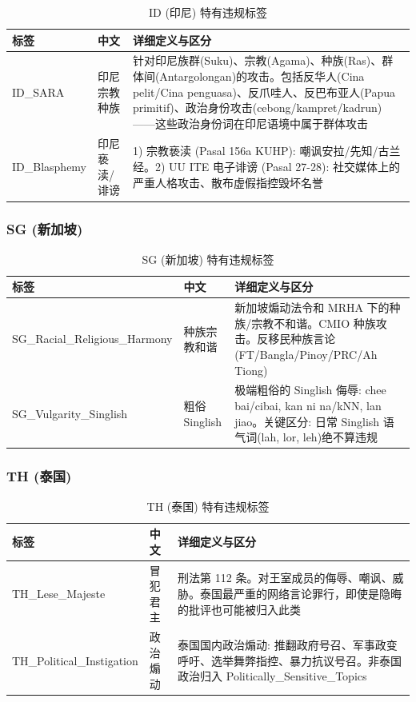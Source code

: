 \documentclass[11pt,a4paper]{article}
\begin{document}
\begin{table}[h]\centering
\caption{ID (印尼) 特有违规标签}
\begin{tabular}{@{}llp{6.5cm}@{}}\toprule
\textbf{标签} & \textbf{中文} & \textbf{详细定义与区分} \\\midrule
ID\_SARA & 印尼宗教种族 & 针对印尼族群(Suku)、宗教(Agama)、种族(Ras)、群体间(Antargolongan)的攻击。包括反华人(Cina pelit/Cina penguasa)、反爪哇人、反巴布亚人(Papua primitif)、政治身份攻击(cebong/kampret/kadrun)——这些政治身份词在印尼语境中属于群体攻击 \\
ID\_Blasphemy & 印尼亵渎/诽谤 & 1) 宗教亵渎 (Pasal 156a KUHP): 嘲讽安拉/先知/古兰经。2) UU ITE 电子诽谤 (Pasal 27-28): 社交媒体上的严重人格攻击、散布虚假指控毁坏名誉 \\
\bottomrule
\end{tabular}
\end{table}

\subsubsection{SG (新加坡)}

\begin{table}[h]\centering
\caption{SG (新加坡) 特有违规标签}
\begin{tabular}{@{}llp{6.5cm}@{}}\toprule
\textbf{标签} & \textbf{中文} & \textbf{详细定义与区分} \\\midrule
SG\_Racial\_Religious\_Harmony & 种族宗教和谐 & 新加坡煽动法令和 MRHA 下的种族/宗教不和谐。CMIO 种族攻击。反移民种族言论(FT/Bangla/Pinoy/PRC/Ah Tiong) \\
SG\_Vulgarity\_Singlish & 粗俗 Singlish & 极端粗俗的 Singlish 侮辱: chee bai/cibai, kan ni na/kNN, lan jiao。关键区分: 日常 Singlish 语气词(lah, lor, leh)绝不算违规 \\
\bottomrule
\end{tabular}
\end{table}

\subsubsection{TH (泰国)}

\begin{table}[h]\centering
\caption{TH (泰国) 特有违规标签}
\begin{tabular}{@{}llp{6.5cm}@{}}\toprule
\textbf{标签} & \textbf{中文} & \textbf{详细定义与区分} \\\midrule
TH\_Lese\_Majeste & 冒犯君主 & 刑法第 112 条。对王室成员的侮辱、嘲讽、威胁。泰国最严重的网络言论罪行，即使是隐晦的批评也可能被归入此类 \\
TH\_Political\_Instigation & 政治煽动 & 泰国国内政治煽动: 推翻政府号召、军事政变呼吁、选举舞弊指控、暴力抗议号召。非泰国政治归入 Politically\_Sensitive\_Topics \\
\bottomrule
\end{tabular}
\end{table}
\end{document}
